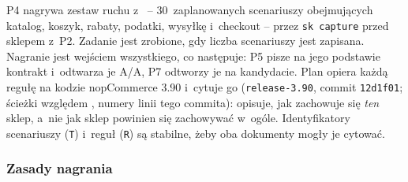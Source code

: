 P4 nagrywa zestaw ruchu z~ -- 30~zaplanowanych
scenariuszy obejmujących katalog, koszyk, rabaty, podatki, wysyłkę i~checkout -- przez
\texttt{sk capture} przed sklepem z~P2. Zadanie jest zrobione, gdy liczba scenariuszy jest
zapisana. Nagranie jest wejściem wszystkiego, co następuje: P5 pisze na jego podstawie
kontrakt i~odtwarza je A/A, P7 odtworzy je na kandydacie. Plan opiera każdą regułę na
kodzie nopCommerce 3.90 i~cytuje go (\texttt{release-3.90}, commit \texttt{12d1f01};
ścieżki względem , numery linii tego commita): opisuje, jak zachowuje się
\emph{ten} sklep, a~nie jak sklep powinien się zachowywać w~ogóle. Identyfikatory
scenariuszy (\texttt{T}) i~reguł (\texttt{R}) są stabilne, żeby oba dokumenty mogły je
cytować.


\subsubsection{Zasady nagrania}\label{sec:bench-ruch-zasady}

